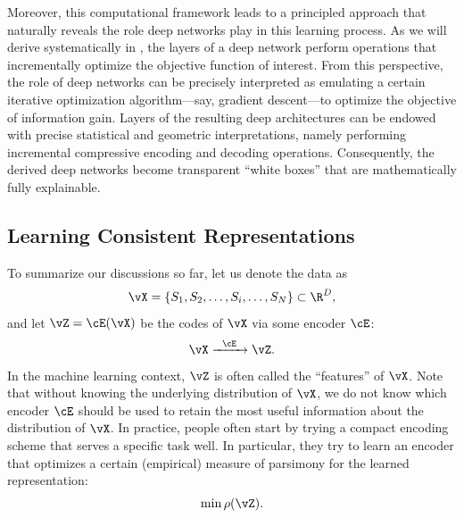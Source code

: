 \documentclass[../../book-main.tex]{subfiles}
\begin{document}
Moreover, this computational framework leads to a principled approach
that naturally reveals the role deep networks play in this learning
process. As we will derive systematically in
, the layers of a deep network perform
operations that incrementally optimize the objective function of
interest. From this perspective, the role of deep networks can be
precisely interpreted as emulating a certain iterative optimization
algorithm---say, gradient descent---to optimize the objective of
information gain. Layers of the resulting deep architectures can be
endowed with precise statistical and geometric interpretations,
namely performing incremental compressive encoding and decoding
operations. Consequently, the derived deep networks become
transparent ``white boxes'' that are mathematically fully explainable.

\subsection{Learning Consistent Representations}

\label{sec:consistency}

To summarize our discussions so far, let us denote the data as
\begin{equation}
    \vX = \{S_{1}, S_{2}, \ldots, S_{i}, \ldots, S_{N}\} \subset \R^{D},
\end{equation}
and let \(\vZ = \cE(\vX)\) be the codes of \(\vX\) via some encoder \(\cE\):
\begin{equation}
    \vX  \xrightarrow{\hspace{2mm} \cE\hspace{2mm}} \vZ.
    \label{eqn:open-loop}
\end{equation}
In the machine learning context, \(\vZ\) is often called the
``features'' of \(\vX\). Note that without knowing the underlying
distribution of \(\vX\), we do not know which encoder \(\cE\) should
be used to retain the most useful information about the distribution
of \(\vX\). In practice, people often start by trying a compact
encoding scheme that serves a specific task well. In particular, they
try to learn an encoder that optimizes a certain (empirical) measure
of parsimony for the learned representation:
\begin{equation}
    \min \rho(\vZ).
\end{equation}
\end{document}

